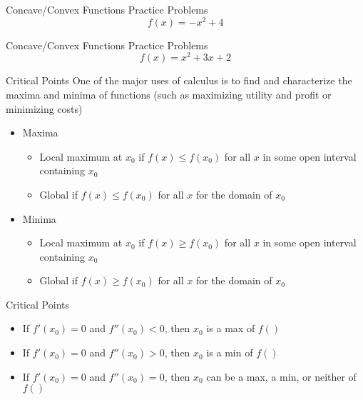 \documentclass[aspectratio=169]{beamer}
\begin{document}
\begin{frame}{Concave/Convex Functions Practice Problems}\label{main1}
	\vspace{-4cm}
     \[
    f(x) = -x^2 + 4
    \]
\end{frame}

\begin{frame}{Concave/Convex Functions Practice Problems}\label{main2}
    \vspace{-4cm}
    \[
    f(x) = x^2 + 3x + 2
    \]
\end{frame}

\begin{frame}{Critical Points}\label{main1}
    One of the major uses of calculus is to find and characterize the maxima and minima of functions (such as maximizing utility and profit or minimizing costs)
    \begin{itemize}
    \item Maxima
    \begin{itemize}
        \item Local maximum at $x_0$ if $f(x) \leq f(x_0)$ for all $x$ in some open interval containing $x_0$ 
        \item Global if $f(x) \leq f(x_0)$ for all $x$ for the domain of $x_0$ 
    \end{itemize}
    \item Minima
   \begin{itemize}
        \item Local maximum at $x_0$ if $f(x) \geq f(x_0)$ for all $x$ in some open interval containing $x_0$ 
        \item Global if $f(x) \geq f(x_0)$ for all $x$ for the domain of $x_0$ 
    \end{itemize}
    \end{itemize}
\end{frame}

\begin{frame}{Critical Points}\label{main1}
    \begin{itemize}
    \begin{itemize}
        \item If $f'(x_0) = 0$ and $f''(x_0) < 0$, then $x_0$ is a max of $f()$
        \item If $f'(x_0) = 0$ and $f''(x_0) > 0$, then $x_0$ is a min of $f()$
        \item If $f'(x_0) = 0$ and $f''(x_0) = 0$, then $x_0$ can be a max, a min, or neither of $f()$
    \end{itemize}
    \end{itemize}
\end{frame}
\end{document}
